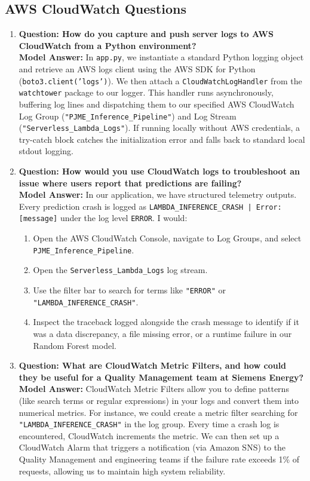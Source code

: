 \documentclass[11pt,a4paper]{article}
\begin{document}
\subsection{AWS CloudWatch Questions}

\begin{enumerate}[leftmargin=*]
    \item \textbf{Question: How do you capture and push server logs to AWS CloudWatch from a Python environment?}
    \\ \textbf{Model Answer:} In \texttt{app.py}, we instantiate a standard Python logging object and retrieve an AWS logs client using the AWS SDK for Python (\texttt{boto3.client('logs')}). We then attach a \texttt{CloudWatchLogHandler} from the \texttt{watchtower} package to our logger. This handler runs asynchronously, buffering log lines and dispatching them to our specified AWS CloudWatch Log Group (\texttt{"PJME\_Inference\_Pipeline"}) and Log Stream (\texttt{"Serverless\_Lambda\_Logs"}). If running locally without AWS credentials, a try-catch block catches the initialization error and falls back to standard local stdout logging.

    \item \textbf{Question: How would you use CloudWatch logs to troubleshoot an issue where users report that predictions are failing?}
    \\ \textbf{Model Answer:} In our application, we have structured telemetry outputs. Every prediction crash is logged as \texttt{LAMBDA\_INFERENCE\_CRASH | Error: [message]} under the log level \texttt{ERROR}. I would:
    \begin{enumerate}
        \item Open the AWS CloudWatch Console, navigate to Log Groups, and select \texttt{PJME\_Inference\_Pipeline}.
        \item Open the \texttt{Serverless\_Lambda\_Logs} log stream.
        \item Use the filter bar to search for terms like \texttt{"ERROR"} or \texttt{"LAMBDA\_INFERENCE\_CRASH"}.
        \item Inspect the traceback logged alongside the crash message to identify if it was a data discrepancy, a file missing error, or a runtime failure in our Random Forest model.
    \end{enumerate}

    \item \textbf{Question: What are CloudWatch Metric Filters, and how could they be useful for a Quality Management team at Siemens Energy?}
    \\ \textbf{Model Answer:} CloudWatch Metric Filters allow you to define patterns (like search terms or regular expressions) in your logs and convert them into numerical metrics. For instance, we could create a metric filter searching for \texttt{"LAMBDA\_INFERENCE\_CRASH"} in the log group. Every time a crash log is encountered, CloudWatch increments the metric. We can then set up a CloudWatch Alarm that triggers a notification (via Amazon SNS) to the Quality Management and engineering teams if the failure rate exceeds 1\% of requests, allowing us to maintain high system reliability.
\end{enumerate}
\end{document}
